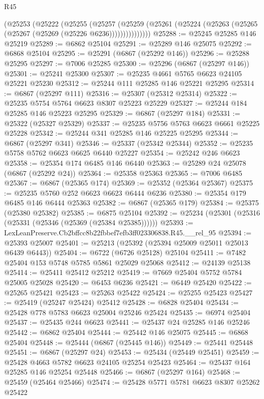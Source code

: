 \begin{lexlean}{R45}
\begin{coremodule}
{          (@25253
            (@25222
              (@25255
                (@25257
                  (@25259
                    (@25261 (@25224 (@25263 (@25265 (@25267 (@25269 (@25226 @6236)))))))))))))))
@25288 := @25245 @25285 @146 @25219
@25289 := @6862 @25104
@25291 := @25289 @146 @25075
@25292 := @6868 @25104
@25295 := @25291 (@6867 (@25292 @146))
@25296 := @25288 @25295
@25297 := @7006 @25285
@25300 := @25296 (@6867 (@25297 @146))
@25301 := @25241 @25300
@25307 := @25235 @4661 @5765 @6623 @24105 @25221 @25230
@25312 := @25244 @111 @25285 @146 @25221 @25295
@25314 := @6867 (@25297 @111)
@25316 := @25307 (@25312 @25314)
@25322 := @25235 @5754 @5764 @6623 @8307 @25223 @25229
@25327 := @25244 @184 @25285 @146 @25223 @25295
@25329 := @6867 (@25297 @184)
@25331 := @25322 (@25327 @25329)
@25337 := @25235 @5756 @5763 @6623 @6661 @25225 @25228
@25342 := @25244 @341 @25285 @146 @25225 @25295
@25344 := @6867 (@25297 @341)
@25346 := @25337 (@25342 @25344)
@25352 := @25235 @5758 @5762 @6623 @6625 @6440 @25227
@25354 := @25242 @246 @6623
@25358 := @25354 @174 @6485 @146 @6440
@25363 := @25289 @24 @25078 (@6867 (@25292 @24))
@25364 := @25358 @25363
@25365 := @7006 @6485
@25367 := @6867 (@25365 @174)
@25369 := @25352 (@25364 @25367)
@25375 := @25235 @5760 @252 @6623 @6623 @6444 @6236
@25380 := @25354 @179 @6485 @146 @6444 @25363
@25382 := @6867 (@25365 @179)
@25384 := @25375 (@25380 @25382)
@25385 := @6875 @25104
@25392 := @25234 (@25301 (@25316 (@25331 (@25346 (@25369 (@25384 @25385))))))
@25393 := LexLeanPreserve.Cb2bffcc8b22fbbef7efb3ff023306838.R45.__rel_95
@25394 := @25393 @25007
@25401 := @25213 (@25392 (@25394 @25009 @25011 @25013 @6439 @6443))
@25404 := @6722 (@6726 @25128) @25104
@25411 := @7482 @25404 @153 @5748 @5785 @5861 @25029 @25068
@25412 := @24139 @25138
@25414 := @25411 @25412 @25212
@25419 := @7669 @25404 @5752 @5784 @25005 @25028
@25420 := @6453 @6236
@25421 := @6449 @25420
@25422 := @25265 @25421
@25423 := @25263 @25422
@25424 := @25255 @25423
@25427 := @25419 (@25247 @25424) @25412
@25428 := @6828 @25404
@25434 := @25428 @778 @5783 @6623 @25004 @25246 @25424
@25435 := @6974 @25404
@25437 := @25435 @244 @6623
@25441 := @25437 @24 @25285 @146 @25246
@25442 := @6862 @25404
@25444 := @25442 @146 @25075
@25445 := @6868 @25404
@25448 := @25444 (@6867 (@25445 @146))
@25449 := @25441 @25448
@25451 := @6867 (@25297 @24)
@25453 := @25434 (@25449 @25451)
@25459 := @25428 @4663 @5782 @6623 @24105 @25254 @25423
@25464 := @25437 @164 @25285 @146 @25254 @25448
@25466 := @6867 (@25297 @164)
@25468 := @25459 (@25464 @25466)
@25474 := @25428 @5771 @5781 @6623 @8307 @25262 @25422
}
\end{coremodule}
\end{lexlean}

